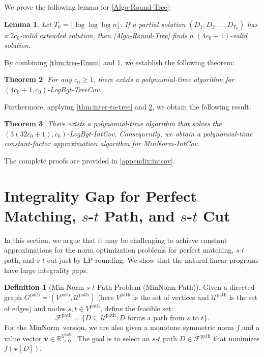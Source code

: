 \documentclass[11pt,a4paper]{article} \usepackage{enumitem}
\newcommand{\assigned}[1]{[ #1 ]}
\newcommand{\calF}{\mathcal{F}}
\newcommand{\calU}{\mathcal{U}}
\newcommand{\boldv}{\boldsymbol{v}}
\newcommand{\minnorm}{\textsf{MinNorm}}
\newcommand{\minnormintcov}{\textsf{MinNorm-IntCov}}
\newcommand{\LBOintcov}{\textsf{LogBgt-IntCov}}
\newcommand{\LBOtreecov}{\textsf{LogBgt-TreeCov}}
\newcommand{\minnormpath}{\textsf{MinNorm-Path}}
\newcommand{\pathU}{\operatorname{\calU^{path}}}
\newcommand{\pathF}{\operatorname{\calF^{path}}}
\newcommand{\pathG}{G^{\operatorname{path}}}
\newcommand{\pathV}{V^{\operatorname{path}}}
\newtheorem{theorem}{Theorem}[section]
\newtheorem{lemma}[theorem]{Lemma}
\theoremstyle{definition}
\newtheorem{definition}{Definition}[section]
\begin{document}
We prove the following lemma for \cref{Algo-Round-Tree}:

\begin{lemma}\label{lem:tree-round-3}
Let \( T_0 = \lfloor \log\log\log n \rfloor \). If a partial solution \( (D_1, D_2, \dots, D_{T_0}) \) has a \( 2c_0 \)-valid extended solution, then \cref{Algo-Round-Tree} finds a \( (4c_0 + 1) \)-valid solution.
\end{lemma}

By combining \cref{thm:tree-Enum} and \cref{lem:tree-round-3}, we establish the following theorem:

\begin{theorem}\label{thm:tree-solve}
For any \( c_0 \geq 1 \), there exists a polynomial-time algorithm for \( (4c_0 + 1, c_0) \)-\LBOtreecov.
\end{theorem}

Furthermore, applying \cref{thm:inter-to-tree} and \cref{thm:tree-solve}, we obtain the following result:

\begin{theorem} \label{thm:inter-cover}
There exists a polynomial-time algorithm that solves the \( (3(32c_0 + 1), c_0) \)-\LBOintcov. Consequently, we obtain a polynomial-time constant-factor approximation algorithm for \minnormintcov.
\end{theorem}

The complete proofs are provided in \cref{appendix:intcov}.


 \section{Integrality Gap for Perfect Matching, $s$-$t$ Path, and $s$-$t$ Cut}
\label{sec:integralgap}

In this section, we argue that it may be challenging to achieve constant approximations for the norm optimization problems for perfect matching, $s$-$t$ path, and $s$-$t$ cut just by LP rounding. 
We show that the natural linear programs
have large integrality gaps.

\begin{definition}[Min-Norm $s$-$t$ Path Problem (\minnormpath)]
Given a directed graph $\pathG = (\pathV, \pathU)$ (here $\pathV$ is the set of vertices and $\pathU$ is the set of edges) and nodes $s, t \in \pathV$, define the feasible set:
$$
\pathF = \{D \subseteq \pathU : D \text{ forms a path from } s \text{ to } t \}.
$$
For the \minnorm\ version, we are also given a monotone symmetric norm $f$ and a value vector $\boldv \in \mathbb{R}_{\geq 0}^{\pathU}$. The goal is to select an $s$-$t$ path $D \in \pathF$ that minimizes $f(\boldv\assigned{D})$.
\end{definition}
\end{document}
